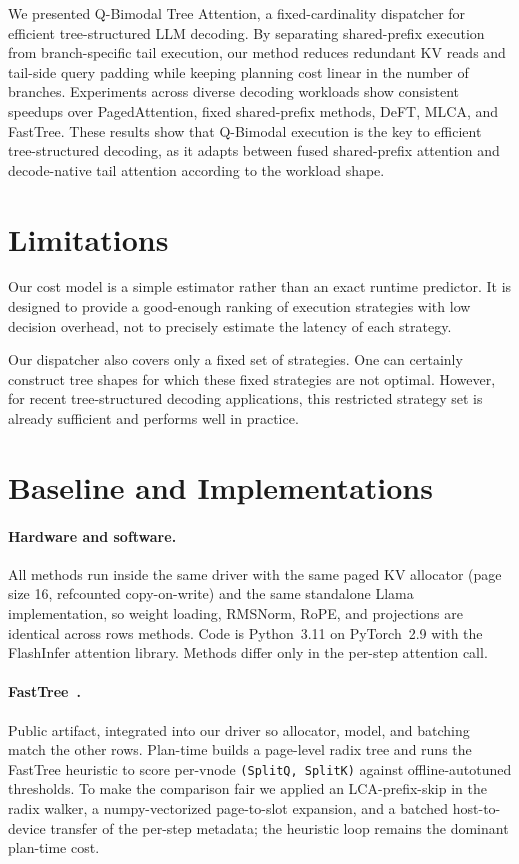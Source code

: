 \documentclass[11pt]{article}
\begin{document}
We presented Q-Bimodal Tree Attention, a fixed-cardinality dispatcher for
efficient tree-structured LLM decoding. By separating shared-prefix execution
from branch-specific tail execution, our method reduces redundant KV reads and
tail-side query padding while keeping planning cost linear in the number of
branches. Experiments across diverse decoding workloads show consistent
speedups over PagedAttention, fixed shared-prefix methods, DeFT, MLCA, and
FastTree. These results show that Q-Bimodal execution is the key to efficient
tree-structured decoding, as it adapts between fused shared-prefix attention
and decode-native tail attention according to the workload shape.

\section*{Limitations}

Our cost model is a simple estimator rather than an exact runtime predictor. It is
designed to provide a good-enough ranking of execution strategies with low
decision overhead, not to precisely estimate the latency of each strategy.

Our dispatcher also covers only a fixed set of strategies. One can certainly
construct tree shapes for which these fixed strategies are not optimal.
However, for recent tree-structured decoding applications, this restricted
strategy set is already sufficient and performs well in practice.





\appendix
\label{sec:appendix}


\section{Baseline and Implementations}
  \label{appendix:implementations}
  \paragraph{Hardware and software.} All methods run inside the same
  driver with the same paged KV allocator (page size 16, refcounted
  copy-on-write) and the same standalone Llama implementation, so
  weight loading, RMSNorm, RoPE, and projections are identical across
  rows methods. Code is Python~3.11 on
  PyTorch~2.9 with the FlashInfer attention library. Methods differ only
  in the per-step attention call.

  \paragraph{FastTree~\cite{pan2025fasttree}.} Public artifact,
  integrated into our driver so allocator, model, and batching match
  the other rows. Plan-time builds a page-level radix tree and runs
  the FastTree heuristic to score per-vnode
  \texttt{(SplitQ, SplitK)} against offline-autotuned thresholds. To
  make the comparison fair we applied an LCA-prefix-skip in the radix
  walker, a numpy-vectorized page-to-slot expansion, and a batched
  host-to-device transfer of the per-step metadata; the heuristic loop
  remains the dominant plan-time cost.
\end{document}
